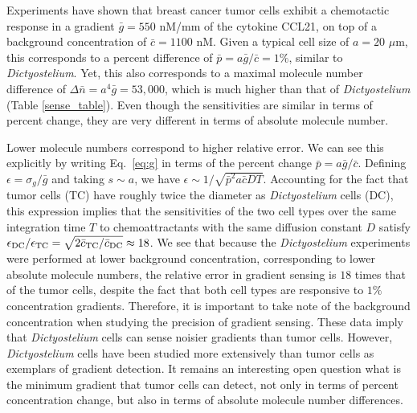 Experiments \cite{shields2007autologous} have shown that breast cancer tumor cells exhibit a chemotactic response in a gradient $\bar{g} = 550$ nM/mm of the cytokine CCL21, on top of a background concentration of $\bar{c} = 1100$ nM. Given a typical cell size of $a = 20$ $\mu$m, this corresponds to a percent difference of $\bar{p} = a\bar{g}/\bar{c} = 1\%$, similar to \textit{Dictyostelium}. Yet, this also corresponds to a maximal molecule number difference of $\Delta\bar{n} = a^4\bar{g} = 53,$$000$, which is much higher than that of \textit{Dictyostelium} (Table \ref{sense_table}). Even though the sensitivities are similar in terms of percent change, they are very different in terms of absolute molecule number.

Lower molecule numbers correspond to higher relative error. We can see this explicitly by writing Eq.\ \ref{eq:g} in terms of the percent change $\bar{p} = a\bar{g}/\bar{c}$. Defining $\epsilon = \sigma_g/\bar{g}$ and taking $s \sim a$, we have $\epsilon \sim 1/\sqrt{\bar{p}^2a\bar{c}DT}$. Accounting for the fact that tumor cells (TC) have roughly twice the diameter as \textit{Dictyostelium} cells (DC), this expression implies that the sensitivities of the two cell types over the same integration time $T$ to chemoattractants with the same diffusion constant $D$ satisfy
$\epsilon_{\rm DC}/\epsilon_{\rm TC} = \sqrt{2\bar{c}_{\rm TC}/\bar{c}_{\rm DC}} \approx 18$.
We see that because the \textit{Dictyostelium} experiments were performed at lower background concentration, corresponding to lower absolute molecule numbers, the relative error in gradient sensing is $18$ times that of the tumor cells, despite the fact that both cell types are responsive to $1\%$ concentration gradients. Therefore, it is important to take note of the background concentration when studying the precision of gradient sensing. These data imply that \textit{Dictyostelium} cells can sense noisier gradients than tumor cells. However, \textit{Dictyostelium} cells have been studied more extensively than tumor cells as exemplars of gradient detection. It remains an interesting open question what is the minimum gradient that tumor cells can detect, not only in terms of percent concentration change, but also in terms of absolute molecule number differences.



